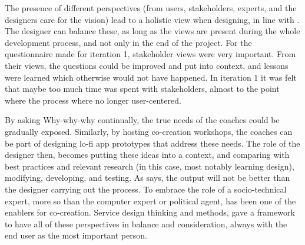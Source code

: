   The presence of different perspectives (from users, stakeholders, experts, and the designers care for the vision) lead to a holistic view when designing, in line with \cite{stickdorn}. The designer can balance these, as long as the views are present during the whole development process, and not only in the end of the project. For the questionnaire made for iteration 1, stakeholder views were very important. From their views, the questions could be improved and put into context, and lessons were learned which otherwise would not have happened. In iteration 1 it was felt that maybe too much time was spent with stakeholders, almost to the point where the process where no longer user-centered.

  By asking Why-why-why continually, the true needs of the coaches could be gradually exposed. Similarly, by hosting co-creation workshops, the coaches can be part of designing lo-fi app prototypes that address these needs. The role of the designer then, becomes putting these ideas into a context, and comparing with best practices and relevant research (in this case, most notably learning design), modifying, developing, and testing. As \cite{lowgren} says, the output will not be better than the designer carrying out the process. To embrace the role of a socio-technical expert, more so than the computer expert or political agent, has been one of the enablers for co-creation. Service design thinking and methods, gave a framework to have all of these perspectives in balance and consideration, always with the end user as the most important person.












